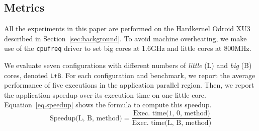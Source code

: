 




\subsection{Metrics}
\label{sec:metrics}

All the experiments in this paper are performed on the Hardkernel Odroid XU3 described in Section~\ref{sec:background}. To avoid machine overheating, we make use of the \texttt{cpufreq} driver to set big cores at 1.6GHz and little cores at 800MHz. 

We evaluate seven configurations with different numbers of \textit{little} (L) and \textit{big} (B) cores, denoted \texttt{L+B}.
For each configuration and benchmark, we report the average performance of five executions in the application parallel region. Then, we report the application speedup over its execution time on one little core.
Equation~\ref{eq.speedup} shows the formula to compute this speedup.
\begingroup\makeatletter\def\f@size{9}\check@mathfonts
\begin{equation}
  \text{Speedup(L, B, method)} = \frac{\text{Exec. time(1, 0, method)}}{\text{Exec. time(L, B, 
method)}}
\label{eq.speedup}
\end{equation}
\endgroup


